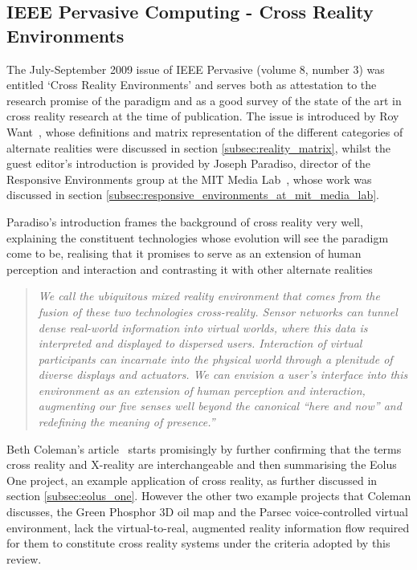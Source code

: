 \subsection{IEEE Pervasive Computing - Cross Reality Environments}
\label{subsec:ieee_pervasive_computing_-_cross_reality_environments}
The July-September 2009 issue of IEEE Pervasive (volume 8, number 3) was entitled `Cross Reality Environments' and serves both as attestation to the research promise of the paradigm and as a good survey of the state of the art in cross reality research at the time of publication. The issue is introduced by Roy Want~\cite{Want2009}, whose definitions and matrix representation of the different categories of alternate realities were discussed in section \ref{subsec:reality_matrix}, whilst the guest editor's introduction is provided by Joseph Paradiso, director of the Responsive Environments group at the MIT Media Lab~\cite{Paradiso2009}, whose work was discussed in section \ref{subsec:responsive_environments_at_mit_media_lab}.

Paradiso's introduction frames the background of cross reality very well, explaining the constituent technologies whose evolution will see the paradigm come to be, realising that it promises to serve as an extension of human perception and interaction and contrasting it with other alternate realities

\begin{quote}
\textit{We call the ubiquitous mixed reality environment that comes from the fusion of these two technologies cross-reality. Sensor networks can tunnel dense real-world information into virtual worlds, where this data is interpreted and displayed to dispersed users. Interaction of virtual participants can incarnate into the physical world through a plenitude of diverse displays and actuators. We can envision a user's interface into this environment as an extension of human perception and interaction, augmenting our five senses well beyond the canonical ``here and now'' and redefining the meaning of presence.''}
\end{quote}

Beth Coleman's article~\cite{Coleman2009} starts promisingly by further confirming that the terms cross reality and X-reality are interchangeable and then summarising the Eolus One project, an example application of cross reality, as further discussed in section \ref{subsec:eolus_one}. However the other two example projects that Coleman discusses, the Green Phosphor 3D oil map and the Parsec voice-controlled virtual environment, lack the virtual-to-real, augmented reality information flow required for them to constitute cross reality systems under the criteria adopted by this review.

